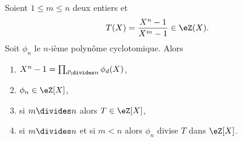 \begin{proposition}     \label{PropUImYnL}
    Soient \( 1\leq m\leq n\) deux entiers et
    \begin{equation}
        T(X)=\frac{ X^n-1 }{ X^m-1 }\in \eZ(X).
    \end{equation}
    Soit \( \phi_n\) le \( n\)-ième polynôme cyclotomique. Alors
    \begin{enumerate}
        \item
            \( X^n-1=\prod_{d\divides n}\phi_d(X)\),
        \item
            \( \phi_n\in \eZ[X]\),
        \item   \label{ItemhpDPKE}
            si \( m\divides n\) alors \( T\in \eZ[X]\),
        \item
            si \( m\divides n\) et si \( m<n\) alors \( \phi_n\) divise \( T\) dans \( \eZ[X]\).
    \end{enumerate}
\end{proposition}


